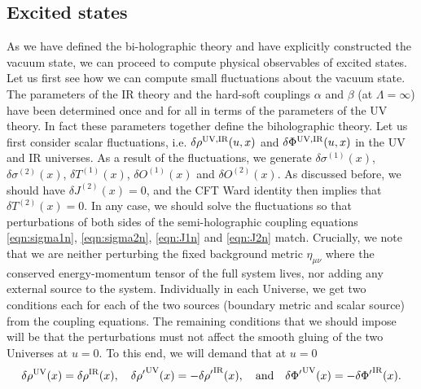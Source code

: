 \documentclass[prd,reprint,a4paper,showpacs,superscriptaddress,11pt,onecolumn,nofootinbib]{revtex4-1}
\newcommand{\be}{\begin{equation}}
\newcommand{\ee}{\end{equation}}
\renewcommand{\(}{\left(}
\renewcommand{\)}{\right)}
\newcommand{\6}{\partial}
\begin{document}
\subsection{Excited states}\label{es}
As we have defined the bi-holographic theory and have explicitly constructed the vacuum state, we can proceed to compute physical observables of excited states. Let us first see how we can compute small fluctuations about the vacuum state. The parameters of the IR theory and the hard-soft couplings $\alpha$ and $\beta$ (at $\Lambda = \infty$) have been determined once and for all in terms of the parameters of  the UV theory. In fact these parameters together define the biholographic theory. Let us first consider scalar fluctuations, i.e. $\delta \rho^{\rm UV, IR}(u, x)$ and  $\delta \Phi^{\rm UV, IR}(u, x)$ in the UV and IR universes. As a result of the fluctuations, we generate $\delta\sigma^{(1)}(x)$, $\delta\sigma^{(2)}(x)$, $\delta T^{(1)}(x)$, $\delta O^{(1)}(x)$ and $\delta O^{(2)}(x)$. As discussed before, we should have $\delta J^{(2)}(x) = 0$, and the CFT Ward identity then implies that $\delta T^{(2)}(x) = 0$. In any case, we should solve the fluctuations so that perturbations of both sides of the semi-holographic coupling equations \eqref{eqn:sigma1n},  \eqref{eqn:sigma2n},  \eqref{eqn:J1n} and  \eqref{eqn:J2n} match. Crucially, we note that we are neither perturbing the fixed background metric $\eta_{\mu\nu}$ where the conserved energy-momentum tensor of the full system lives, nor adding any external source to the system. Individually in each Universe, we get two conditions each for each of the two sources (boundary metric and scalar source) from the coupling equations. The remaining conditions that we should impose will be that the perturbations must not affect the smooth gluing of the two Universes at $u= 0$. To this end, we will demand that at $u=0$
\be
\delta \rho^{\rm UV}(x) = \delta \rho^{\rm IR}(x), \quad {\delta \rho'}^{\rm UV}(x) = -{\delta \rho'}^{\rm IR}(x), \quad \text{and}\quad {\delta \Phi'}^{\rm UV}(x) = -{\delta \Phi'}^{\rm IR}(x).
\ee
\end{document}
